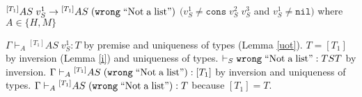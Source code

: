 \begin{case}
$^{[T_{1}]}AS\;v_{S}^{1}\rightarrow{^{[T_{1}]}A}S\;(\mathtt{wrong}\;\mathrm{``Not\;a\;list"})$ $(v_{S}^{1}\neq\mathtt{cons}\;v_{S}^{2}\;v_{S}^{3}$ and $v_{S}^{1}\neq\mathtt{nil})$ where $A\in\lbrace H,M\rbrace$

$\Gamma\vdash_{A}{^{[T_{1}]}AS}\;v_{S}^{1}:T$ by premise and uniqueness of types (Lemma \ref{uot}).  $T=[T_{1}]$ by inversion (Lemma \ref{i}) and uniqueness of types.  $\vdash_{S}\mathtt{wrong}\;\mathrm{``Not\;a\;list"}:TST$ by inversion.  $\Gamma\vdash_{A}{^{[T_{1}]}A}S\;(\mathtt{wrong}\;\mathrm{``Not\;a\;list"}):[T_{1}]$ by inversion and uniqueness of types.  $\Gamma\vdash_{A}{^{[T_{1}]}A}S\;(\mathtt{wrong}\;\mathrm{``Not\;a\;list"}):T$ because $[T_{1}]=T$.
\end{case}
